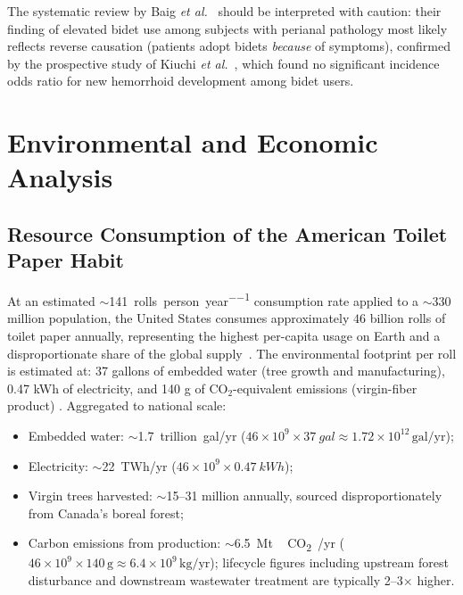 \documentclass[aps,prfluids,reprint,amsmath,amssymb,floatfix]{revtex4-2}
\begin{document}
The systematic review by Baig \textit{et al.}\ \citep{Baig2022} should be
interpreted with caution: their finding of elevated bidet use among subjects
with perianal pathology most likely reflects reverse causation (patients adopt
bidets \emph{because} of symptoms), confirmed by the prospective study of
Kiuchi \textit{et al.}\ \citep{Kiuchi2017}, which found no significant incidence
odds ratio for new hemorrhoid development among bidet users.

\section{Environmental and Economic Analysis}
\label{sec:enviro}

\subsection{Resource Consumption of the American Toilet Paper Habit}

At an estimated $\sim$\SI{141}{rolls\per person\per year} consumption rate
applied to a $\sim 330$ million population, the United States consumes
approximately $46$ billion rolls of toilet paper annually, representing
the highest per-capita usage on Earth and a disproportionate share of
the global supply~\citep{ScientificAmerican2009}. The environmental
footprint per roll is estimated at: 37 gallons of embedded water (tree
growth and manufacturing), 0.47 kWh of electricity, and 140 g of
CO$_2$-equivalent emissions (virgin-fiber product) \citep{NRDC2020}.
Aggregated to national scale:
\begin{itemize}[leftmargin=*]
    \item Embedded water: $\sim$\SI{1.7}{trillion gal/yr}
    ($46 \times 10^9 \times \SI{37}{gal} \approx
    1.72 \times 10^{12}\,\mathrm{gal/yr}$);
    \item Electricity: $\sim$\SI{22}{TWh/yr}
    ($46 \times 10^9 \times \SI{0.47}{kWh}$);
    \item Virgin trees harvested: $\sim$15--31 million annually, sourced
    disproportionately from Canada's boreal forest;
    \item Carbon emissions from production:
    $\sim$\SI{6.5}{Mt\,CO_2/yr}
    ($46 \times 10^9 \times 140\,\mathrm{g} \approx
    6.4 \times 10^9\,\mathrm{kg/yr}$); lifecycle figures including
    upstream forest disturbance and downstream wastewater treatment
    are typically 2--3$\times$ higher.
\end{itemize}
\end{document}
